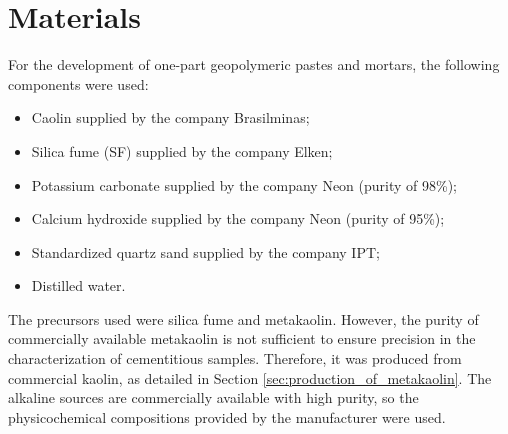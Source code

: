 \section{Materials}
\label{sec:materials}

For the development of one-part geopolymeric pastes and mortars, the following components were used:

\begin{itemize}
    \item Caolin supplied by the company Brasilminas;
    \item Silica fume (SF) supplied by the company Elken;
    \item Potassium carbonate supplied by the company Neon (purity of 98\%);
    \item Calcium hydroxide supplied by the company Neon  (purity of 95\%);
    \item Standardized quartz sand supplied by the company IPT;
    \item Distilled water.
\end{itemize}

The precursors used were silica fume and metakaolin. However, the purity of commercially available metakaolin is not sufficient to ensure precision in the characterization of cementitious samples.
Therefore, it was produced from commercial kaolin, as detailed in Section \ref{sec:production_of_metakaolin}.
The alkaline sources are commercially available with high purity, so the physicochemical compositions provided by the manufacturer were used.

% 

